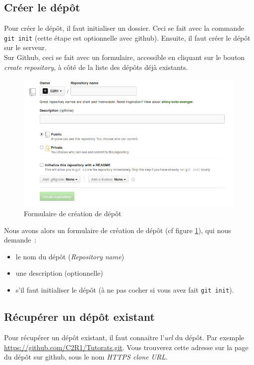 \documentclass[a4paper,10pt]{report}
\begin{document}
    \subsection{Cr\'eer le d\'ep\^ot}
Pour cr\'eer le d\'ep\^ot, il faut initialiser un dossier. Ceci se fait avec la commande \verb|git init| (cette \'etape est optionnelle avec github). Ensuite, il faut cr\'eer le d\'ep\^ot sur le serveur.\\
Sur Github, ceci se fait avec un formulaire, accessible en cliquant sur le bouton \emph{create repository}, \`a c\^ot\'e de la liste des d\'ep\^ots d\'ej\`a existants.\\
\begin{figure}[h!]
  \begin{center}
    \includegraphics[scale=0.3]{images/createRepoForm}
    \caption{Formulaire de cr\'eation de d\'ep\^ot}
    \label{creationRepo}
  \end{center}
\end{figure}

Nous avons alors un formulaire de cr\'eation de d\'ep\^ot (cf figure \ref{creationRepo}), qui nous demande~:
\begin{itemize}
 \item le nom du d\'ep\^ot (\emph{Repository name})
 \item une description (optionnelle)
 \item s'il faut initialiser le d\'ep\^ot (\`a ne pas cocher si vous avez fait \verb|git init|).
\end{itemize}

    \subsection{R\'ecup\'erer un d\'ep\^ot existant}
Pour r\'ecup\'erer un d\'ep\^ot existant, il faut connaitre l'\emph{url} du d\'ep\^ot. Par exemple \url{https://github.com/C2R1/Tutorats.git}. Vous trouverez cette adresse sur la page du d\'ep\^ot sur github, sous le nom \emph{HTTPS clone URL}.\\
\end{document}
